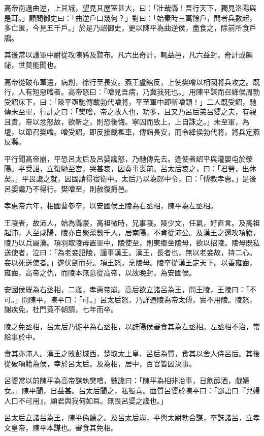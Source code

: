 \begin{pinyinscope}
高帝南過曲逆，上其城，望見其屋室甚大，曰：「壯哉縣！吾行天下，獨見洛陽與是耳。」顧問御史曰：「曲逆戶口幾何？」對曰：「始秦時三萬餘戶，閒者兵數起，多亡匿，今見五千戶。」於是乃詔御史，更以陳平為曲逆侯，盡食之，除前所食戶牖。

其後常以護軍中尉從攻陳豨及黥布。凡六出奇計，輒益邑，凡六益封。奇計或頗祕，世莫能聞也。

高帝從破布軍還，病創，徐行至長安。燕王盧綰反，上使樊噲以相國將兵攻之。既行，人有短惡噲者。高帝怒曰：「噲見吾病，乃冀我死也。」用陳平謀而召絳侯周勃受詔床下，曰：「陳平亟馳傳載勃代噲將，平至軍中即斬噲頭！」二人既受詔，馳傳未至軍，行計之曰：「樊噲，帝之故人也，功多，且又乃呂后弟呂媭之夫，有親且貴，帝以忿怒故，欲斬之，則恐後悔。寧囚而致上，上自誅之。」未至軍，為壇，以節召樊噲。噲受詔，即反接載檻車，傳詣長安，而令絳侯勃代將，將兵定燕反縣。

平行聞高帝崩，平恐呂太后及呂媭讒怒，乃馳傳先去。逢使者詔平與灌嬰屯於滎陽。平受詔，立復馳至宮，哭甚哀，因奏事喪前。呂太后哀之，曰：「君勞，出休矣。」平畏讒之就，因固請得宿衛中。太后乃以為郎中令，曰：「傅教孝惠。」是後呂媭讒乃不得行。樊噲至，則赦復爵邑。

孝惠帝六年，相國曹參卒，以安國侯王陵為右丞相，陳平為左丞相。

王陵者，故沛人，始為縣豪，高祖微時，兄事陵。陵少文，任氣，好直言。及高祖起沛，入至咸陽，陵亦自聚黨數千人，居南陽，不肯從沛公。及漢王之還攻項籍，陵乃以兵屬漢。項羽取陵母置軍中，陵使至，則東鄉坐陵母，欲以招陵。陵母既私送使者，泣曰：「為老妾語陵，謹事漢王。漢王，長者也，無以老妾故，持二心。妾以死送使者。」遂伏劍而死。項王怒，烹陵母。陵卒從漢王定天下。以善雍齒，雍齒，高帝之仇，而陵本無意從高帝，以故晚封，為安國侯。

安國侯既為右丞相，二歲，孝惠帝崩。高后欲立諸呂為王，問王陵，王陵曰：「不可。」問陳平，陳平曰：「可。」呂太后怒，乃詳遷陵為帝太傅，實不用陵。陵怒，謝疾免，杜門竟不朝請，七年而卒。

陵之免丞相，呂太后乃徙平為右丞相，以辟陽侯審食其為左丞相。左丞相不治，常給事於中。

食其亦沛人。漢王之敗彭城西，楚取太上皇、呂后為質，食其以舍人侍呂后。其後從破項籍為侯，幸於呂太后。及為相，居中，百官皆因決事。

呂媭常以前陳平為高帝謀執樊噲，數讒曰：「陳平為相非治事，日飲醇酒，戲婦女。」陳平聞，日益甚。呂太后聞之，私獨喜。面質呂媭於陳平曰：「鄙語曰『兒婦人口不可用』，顧君與我何如耳。無畏呂媭之讒也。」

呂太后立諸呂為王，陳平偽聽之。及呂太后崩，平與太尉勃合謀，卒誅諸呂，立孝文皇帝，陳平本謀也。審食其免相。


\end{pinyinscope}
